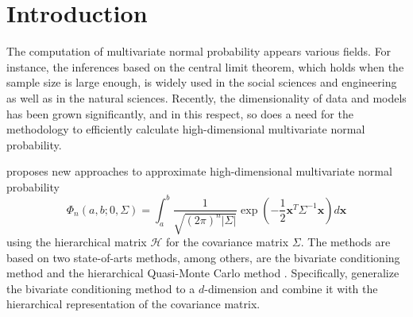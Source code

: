 \chapter{Introduction}

The computation of multivariate normal probability appears various fields. For instance, the inferences based on the central limit theorem, which holds when the sample size is large enough, is widely used in the social sciences and engineering as well as in the natural sciences. Recently, the dimensionality of data and models has been grown significantly, and in this respect, so does a need for the methodology to efficiently calculate high-dimensional multivariate normal probability.

\citet{cao2019hierarchical} proposes new approaches to approximate high-dimensional multivariate normal probability 
$$
\Phi_n(a, b; 0, \Sigma) = \int_a^b \frac{1}{\sqrt{(2\pi)^n |\Sigma|}} \exp\left( -\frac{1}{2} \mathbf{x}^T \Sigma^{-1} \mathbf{x} \right) d\mathbf{x}
$$
using the hierarchical matrix $\mathcal{H}$ \citep{hackbusch2015hierarchical} for the covariance matrix $\Sigma$. The methods are based on two state-of-arts methods, among others, are the bivariate conditioning method \citep{trinh2015bivariate} and the hierarchical Quasi-Monte Carlo method \citep{genton2018hierarchical}. Specifically, \citet{cao2019hierarchical} generalize the bivariate conditioning method to a $d$-dimension and combine it with the hierarchical representation of the covariance matrix. 

